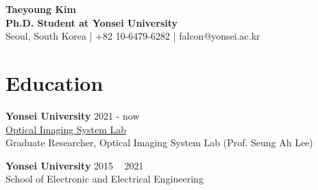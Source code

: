 \documentclass[a4paper,9pt]{extarticle}
\begin{document}
\begin{spacing}{1.05}

\pagestyle{empty}

\begin{center}
\textbf{\Large Taeyoung Kim }\\[6pt] %
\textbf{Ph.D. Student at Yonsei University}\\[1pt] %
Seoul, South Korea | +82 10-6479-6282 | falcon@yonsei.ac.kr %
\end{center}


\section*{Education}
\noindent
\textbf{Yonsei University} \hfill 2021 - now \\ 
\href{https://biomedia.yonsei.ac.kr}{Optical Imaging System Lab} \\ 
Graduate Researcher, Optical Imaging System Lab (Prof. Seung Ah Lee)

\noindent
\textbf{Yonsei University} \hfill 2015 ~ 2021 \\ 
School of Electronic and Electrical Engineering





\end{spacing}
\end{document}
